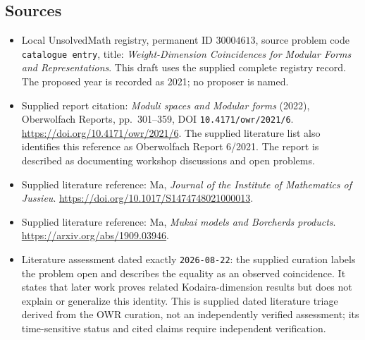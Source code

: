 \documentclass[11pt]{article}
\begin{document}
\subsection{Sources}
\begin{itemize}
\item Local UnsolvedMath registry, permanent ID \(30004613\), source problem code \texttt{catalogue entry}, title: \emph{Weight-Dimension Coincidences for Modular Forms and Representations}. This draft uses the supplied complete registry record. The proposed year is recorded as 2021; no proposer is named.
\item Supplied report citation: \emph{Moduli spaces and Modular forms} (2022), Oberwolfach Reports, pp.~301--359, DOI \texttt{10.4171/owr/2021/6}. \url{https://doi.org/10.4171/owr/2021/6}. The supplied literature list also identifies this reference as Oberwolfach Report 6/2021. The report is described as documenting workshop discussions and open problems.
\item Supplied literature reference: Ma, \emph{Journal of the Institute of Mathematics of Jussieu}. \url{https://doi.org/10.1017/S1474748021000013}.
\item Supplied literature reference: Ma, \emph{Mukai models and Borcherds products}. \url{https://arxiv.org/abs/1909.03946}.
\item Literature assessment dated exactly \texttt{2026-08-22}: the supplied curation labels the problem open and describes the equality as an observed coincidence. It states that later work proves related Kodaira-dimension results but does not explain or generalize this identity. This is supplied dated literature triage derived from the OWR curation, not an independently verified assessment; its time-sensitive status and cited claims require independent verification.
\end{itemize}
\end{document}
